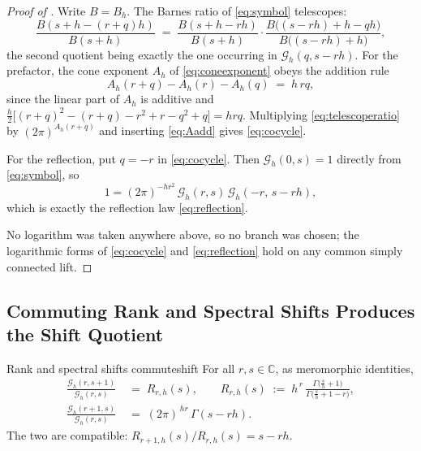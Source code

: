 \documentclass[11pt,letterpaper]{article}
\newcommand{\Gc}{\mathcal{G}}               %
\newcommand{\Cc}{\mathbb{C}}
\newcommand{\Rm}{R}                          %
\begin{document}
\begin{proof}[Proof of ]
Write $B=B_h$. The Barnes ratio of \eqref{eq:symbol} telescopes:
\begin{equation}
  \frac{B(s+h-(r+q)h)}{B(s+h)}
  \;=\;
  \frac{B(s+h-rh)}{B(s+h)}\cdot
  \frac{B\bigl((s-rh)+h-qh\bigr)}{B\bigl((s-rh)+h\bigr)} ,
  \label{eq:telescoperatio}
\end{equation}
the second quotient being exactly the one occurring in $\Gc_h(q,s-rh)$. For the
prefactor, the cone exponent $A_h$ of \eqref{eq:coneexponent} obeys the addition
rule
\begin{equation}
  A_h(r+q)-A_h(r)-A_h(q)\;=\;h\,rq,
  \label{eq:Aadd}
\end{equation}
since the linear part of $A_h$ is additive and
$\tfrac h2\bigl[(r+q)^2-(r+q)-r^2+r-q^2+q\bigr]=hrq$. Multiplying
\eqref{eq:telescoperatio} by $(2\pi)^{A_h(r+q)}$ and inserting \eqref{eq:Aadd}
gives \eqref{eq:cocycle}.

For the reflection, put $q=-r$ in \eqref{eq:cocycle}. Then $\Gc_h(0,s)=1$
directly from \eqref{eq:symbol}, so
\begin{equation*}
  1=(2\pi)^{-hr^{2}}\,\Gc_h(r,s)\,\Gc_h(-r,\,s-rh),
\end{equation*}
which is exactly the reflection law \eqref{eq:reflection}.

No logarithm was taken anywhere above, so no branch was chosen; the logarithmic
forms of \eqref{eq:cocycle} and \eqref{eq:reflection} hold on any common simply
connected lift.
\end{proof}

\subsection{Commuting Rank and Spectral Shifts Produces the Shift Quotient}

\begin{theorem}{Rank and spectral shifts commute}{shift}
For all $r,s\in\Cc$, as meromorphic identities,
\begin{align}
  \frac{\Gc_h(r,s+1)}{\Gc_h(r,s)}
  &\;=\;\Rm_{r,h}(s),
  \qquad
  \Rm_{r,h}(s)\;:=\;h^{\,r}\,
  \frac{\Gamma\!\bigl(\tfrac{s}{h}+1\bigr)}{\Gamma\!\bigl(\tfrac{s}{h}+1-r\bigr)},
  \label{eq:rankmeter}\\[2pt]
  \frac{\Gc_h(r+1,s)}{\Gc_h(r,s)}
  &\;=\;(2\pi)^{\,hr}\,\Gamma(s-rh).
  \label{eq:rshift}
\end{align}
The two are compatible: $\Rm_{r+1,h}(s)/\Rm_{r,h}(s)=s-rh$.
\end{theorem}
\end{document}
